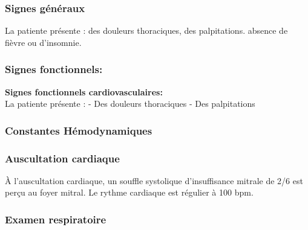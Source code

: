 \documentclass[12pt,a4paper]{article}%
\begin{document}
%
\subsubsection*{Signes généraux}%
\label{ssubsec:Signesgnraux}%

%
La patiente présente : des douleurs thoraciques, des palpitations. absence de fièvre ou d'insomnie.%
\subsubsection*{Signes fonctionnels:}%
\label{ssubsec:Signesfonctionnels}%

%
\textbf{Signes fonctionnels cardiovasculaires:}%
\\%
La patiente présente :\newline%
{-} Des douleurs thoraciques\newline%
{-} Des palpitations%
\subsubsection*{Constantes Hémodynamiques}%
\label{ssubsec:ConstantesHmodynamiques}%

%


\begin{table}[h!]%
\centering%
%
\end{table}

%
\subsubsection*{Auscultation cardiaque}%
\label{ssubsec:Auscultationcardiaque}%

%
À l'auscultation cardiaque, un souffle systolique d'insuffisance mitrale de 2/6 est perçu au foyer mitral. Le rythme cardiaque est régulier à 100 bpm.%
\subsubsection*{Examen respiratoire}%
\label{ssubsec:Examenrespiratoire}%
\end{document}
